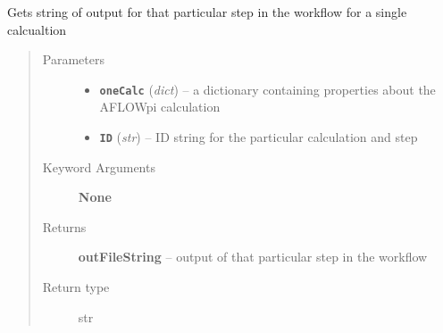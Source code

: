 \documentclass[letterpaper,10pt,english]{sphinxmanual}
\begin{document}
\begin{fulllineitems}
\label{retr:retr.__getOutputString}
Gets string of output for that particular step in the workflow for a single calcualtion
\begin{quote}\begin{description}
\item[{Parameters}] \leavevmode\begin{itemize}
\item {} 
\textbf{\texttt{oneCalc}} (\emph{dict}) -- a dictionary containing properties about the AFLOWpi calculation

\item {} 
\textbf{\texttt{ID}} (\emph{str}) -- ID string for the particular calculation and step

\end{itemize}

\item[{Keyword Arguments}] \leavevmode
\textbf{None}

\item[{Returns}] \leavevmode
\textbf{outFileString} --
output of that particular step in the workflow

\item[{Return type}] \leavevmode
str

\end{description}\end{quote}

\end{fulllineitems}

\end{document}
